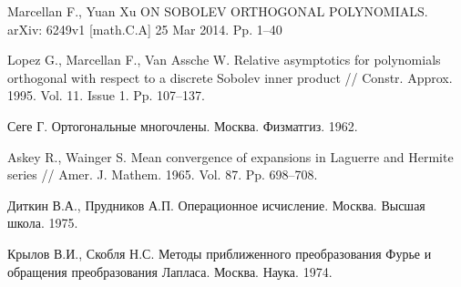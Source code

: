 \begin{thebibliography}{999}
 {Marcellan F., Yuan Xu}
ON SOBOLEV ORTHOGONAL POLYNOMIALS. arXiv: 6249v1 [math.C.A] 25 Mar 2014. Pp. 1--40

 {Lopez G., Marcellan F., Van Assche W.}
Relative asymptotics for polynomials orthogonal with respect to a discrete Sobolev inner product // Constr. Approx. 1995. Vol. 11. Issue 1. Pp. 107--137.

 {Сеге Г.}
Ортогональные многочлены. Москва. Физматгиз. 1962.

 {Askey R., Wainger S.}
Mean convergence of expansions in Laguerre and Hermite series // Amer. J. Mathem. 1965. Vol. 87. Pp. 698--708.

 {Диткин В.А., Прудников А.П.}
Операционное исчисление. Москва. Высшая школа. 1975.

 {Крылов В.И., Скобля Н.С.}
Методы приближенного преобразования Фурье и обращения преобразования Лапласа. Москва. Наука. 1974.
\end{thebibliography}